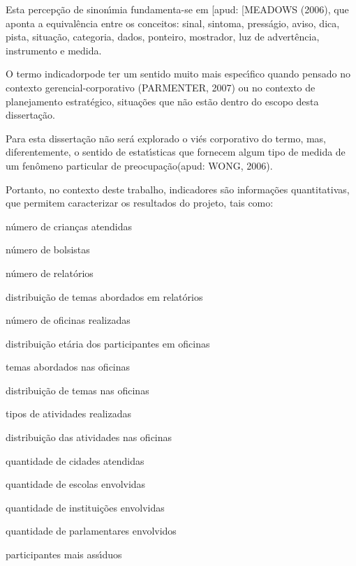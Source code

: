 \documentclass[
12pt,		%
openright,	%
twoside,  %
a4paper,			%
chapter=TITLE,		%
english,			%
french,				%
spanish,			%
brazil				%
]{USPSC-classe/USPSC}
\begin{document}
Esta percep\c{c}\~ao de sinon\'{\i}mia fundamenta-se em [apud: [MEADOWS (2006), que aponta a equival\^encia entre os conceitos: sinal, sintoma, press\'agio, aviso, dica, pista, situa\c{c}\~ao, categoria, dados, ponteiro, mostrador, luz de advert\^encia, instrumento e medida.




O termo \textquotedbl indicador\textquotedbl  pode ter um sentido muito mais espec\'{\i}fico quando pensado no contexto gerencial-corporativo (PARMENTER, 2007) ou no contexto de planejamento estrat\'egico, situa\c{c}\~oes que n\~ao est\~ao dentro do escopo desta disserta\c{c}\~ao.




Para esta disserta\c{c}\~ao n\~ao ser\'a explorado o vi\'es corporativo do termo, mas, diferentemente, o sentido de \textquotedbl estat\'{\i}sticas que fornecem algum tipo de medida de um fen\^omeno particular de preocupa\c{c}\~ao\textquotedbl  (apud: WONG, 2006).




Portanto, no contexto deste trabalho, indicadores s\~ao informa\c{c}\~oes quantitativas, que permitem caracterizar os resultados do projeto, tais como:





\begin{alineas}
\item n\'umero de crian\c{c}as atendidas
\item n\'umero de bolsistas
\item n\'umero de relat\'orios
\item distribui\c{c}\~ao de temas abordados em relat\'orios
\item n\'umero de oficinas realizadas
\item distribui\c{c}\~ao et\'aria dos participantes em oficinas
\item temas abordados nas oficinas
\item distribui\c{c}\~ao de temas nas oficinas
\item tipos de atividades realizadas
\item distribui\c{c}\~ao das atividades nas oficinas
\item quantidade de cidades atendidas
\item quantidade de escolas envolvidas
\item quantidade de institui\c{c}\~oes envolvidas
\item quantidade de parlamentares envolvidos
\item participantes mais ass\'{\i}duos
\end{alineas}
\end{document}
